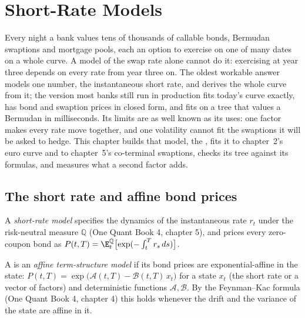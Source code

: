 \chapter{Short-Rate Models}\label{ch:rc:short-rate-models}

Every night a bank values tens of thousands of callable bonds, Bermudan
swaptions and mortgage pools, each an option to exercise on one of many dates
on a whole curve. A model of the swap rate alone cannot do it: exercising at
year three depends on every rate from year three on. The oldest workable answer
models one number, the instantaneous short rate, and derives the whole curve
from it; the version most banks still run in production fits today's curve
exactly, has bond and swaption prices in closed form, and fits on a tree that
values a Bermudan in milliseconds. Its limits are as well known as its uses: one
factor makes every rate move together, and one volatility cannot fit the
swaptions it will be asked to hedge. This chapter builds that model, the
, fits it to chapter~2's euro curve and to chapter~5's
co-terminal swaptions, checks its tree against its formulas, and measures what
a second factor adds.

\section{The short rate and affine bond prices}

\begin{definition}\label{def:rc:short-rate-models:short}
A \emph{short-rate model} specifies the dynamics of the
instantaneous rate $r_t$ under the risk-neutral measure $\mathbb Q$ (One Quant
Book 4, chapter 5), and prices every zero-coupon bond as
$P(t,T) = \E^{\mathbb Q}_t\bigl[\exp(-\int_t^Tr_s\,ds)\bigr]$.
\end{definition}

\begin{definition}\label{def:rc:short-rate-models:affine}
A  is an \emph{affine term-structure model} if its bond prices are exponential-affine in the state:
$P(t,T) = \exp\bigl(\mathcal A(t,T)-\mathcal B(t,T)\,x_t\bigr)$ for a state $x_t$ (the
short rate or a vector of factors) and deterministic functions $\mathcal A,
\mathcal B$. By the Feynman--Kac formula (One Quant Book 4, chapter 4) this holds
whenever the drift and the variance of the state are affine in it.
\end{definition}

